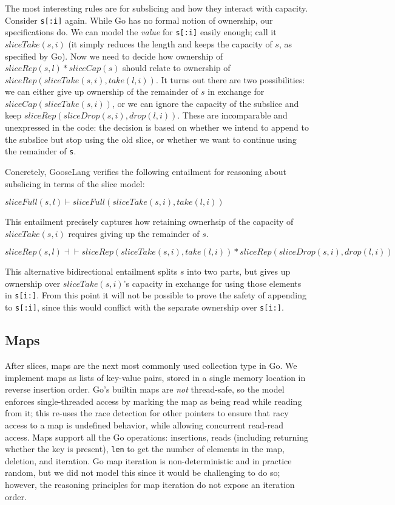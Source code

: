 The most interesting rules are for subslicing and how they interact with
capacity. Consider \texttt{s{[}:i{]}} again. While Go has no formal
notion of ownership, our specifications do. We can model the
\emph{value} for \texttt{s{[}:i{]}} easily enough; call it
\(sliceTake(s, i)\) (it simply reduces the length and keeps the capacity
of \(s\), as specified by Go). Now we need to decide how ownership of
\(sliceRep(s, l) * sliceCap(s)\) should relate to ownership of
\(sliceRep(sliceTake(s, i), take(l, i))\). It turns out there are two
possibilities: we can either give up ownership of the remainder of \(s\)
in exchange for \(sliceCap(sliceTake(s, i))\), or we can ignore the
capacity of the subslice and keep
\(sliceRep(sliceDrop(s, i), drop(l, i))\). These are incomparable and
unexpressed in the code: the decision is based on whether we intend to
append to the subslice but stop using the old slice, or whether we want
to continue using the remainder of \texttt{s}.

Concretely, GooseLang verifies the following entailment for reasoning
about subslicing in terms of the slice model:

\(sliceFull(s, l) \vdash sliceFull(sliceTake(s, i), take(l, i))\)

This entailment precisely captures how retaining ownerhsip of the
capacity of \(sliceTake(s, i)\) requires giving up the remainder of
\(s\).

\(sliceRep(s, l) \dashv\vdash sliceRep(sliceTake(s, i), take(l, i)) * sliceRep(sliceDrop(s, i), drop(l, i))\)

This alternative bidirectional entailment splits \(s\) into two parts,
but gives up ownership over \(sliceTake(s, i)\)'s capacity in exchange
for using those elements in \texttt{s{[}i:{]}}. From this point it will
not be possible to prove the safety of appending to \texttt{s{[}:i{]}},
since this would conflict with the separate ownership over
\texttt{s{[}i:{]}}.

\hypertarget{maps}{%
\subsection{Maps}\label{maps}}

After slices, maps are the next most commonly used collection type in
Go. We implement maps as lists of key-value pairs, stored in a single
memory location in reverse insertion order. Go's builtin maps are
\emph{not} thread-safe, so the model enforces single-threaded access by
marking the map as being read while reading from it; this re-uses the
race detection for other pointers to ensure that racy access to a map is
undefined behavior, while allowing concurrent read-read access. Maps
support all the Go operations: insertions, reads (including returning
whether the key is present), \texttt{len} to get the number of elements
in the map, deletion, and iteration. Go map iteration is
non-deterministic and in practice random, but we did not model this
since it would be challenging to do so; however, the reasoning
principles for map iteration do not expose an iteration order.

